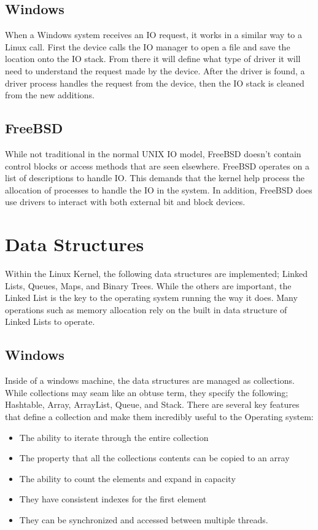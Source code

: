 \documentclass[draftclsnofoot, onecolumn] {report}
\begin{document}
\subsection{Windows}
When a Windows system receives an IO request, it works in a similar way to a Linux call.
First the device calls the IO manager to open a file and save the location onto the IO stack.
From there it will define what type of driver it will need to understand the request made by the device.
After the driver is found, a driver process handles the request from the device, then the IO stack is cleaned from the new additions. 


\subsection{FreeBSD}
While not traditional in the normal UNIX IO model, FreeBSD doesn't contain control blocks or access methods that are seen elsewhere. 
FreeBSD operates on a list of descriptions to handle IO. 
This demands that the kernel help process the allocation of processes to handle the IO in the system.
In addition, FreeBSD does use drivers to interact with both external bit and block devices. 

\section{Data Structures}
Within the Linux Kernel, the following data structures are implemented; Linked Lists, Queues, Maps, and  Binary Trees.
While the others are important, the Linked List is the key to the operating system running the way it does. 
Many operations such as memory allocation rely on the built in data structure of Linked Lists to operate. 

\subsection{Windows}
Inside of a windows machine, the data structures are managed as collections.
While collections may seam like an obtuse term, they specify the following; Hashtable, Array, ArrayList, Queue, and Stack. 
There are several key features that define a collection and make them incredibly useful to the Operating system:
\begin{itemize}
\item The ability to iterate through the entire collection
\item The property that all the collections contents can be copied to an array
\item The ability to count the elements and expand in capacity
\item They have consistent indexes for the first element
\item They can be synchronized and accessed between multiple threads.
\end{itemize}
\end{document}
